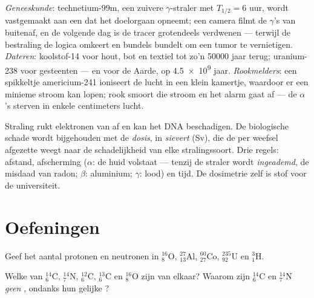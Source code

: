 \begin{example}\label{ex:g11:nucleus-radioactivity:uses}
\emph{Geneeskunde}: technetium-99m, een zuivere $\gamma$-straler met
$T_{1/2} = 6$ uur, wordt vastgemaakt aan een  dat het doelorgaan
opneemt; een camera filmt de $\gamma$'s van buitenaf, en de volgende dag is
de tracer grotendeels verdwenen --- terwijl de bestraling de logica
omkeert en bundels bundelt om een tumor te vernietigen. \emph{Dateren}:
koolstof-14 voor hout, bot en textiel tot zo'n \num{50000} jaar terug;
uranium-238 voor gesteenten --- en voor de Aarde, op \num{4.5e9} jaar.
\emph{Rookmelders}: een spikkeltje americium-241 ioniseert de lucht in een
klein kamertje, waardoor er een minieme stroom kan lopen; rook smoort die
stroom en het alarm gaat af --- de $\alpha$'s sterven in enkele centimeters
lucht.
\end{example}

\begin{remark}\label{rem:g11:nucleus-radioactivity:dose}
Straling rukt elektronen van  af en kan het DNA beschadigen. De
biologische schade wordt bijgehouden met de \emph{dosis}, in
\emph{sievert} (\unit{Sv}), die de per  weefsel
afgezette  weegt naar de schadelijkheid van elke stralingssoort.
Drie regels: afstand, afscherming ($\alpha$: de huid volstaat --- tenzij
de straler wordt \emph{ingeademd}, de misdaad van radon; $\beta$:
aluminium; $\gamma$: lood) en tijd. De dosimetrie zelf is stof voor de
universiteit.
\end{remark}

\section{Oefeningen}

\begin{exercise}[$\star$]\label{exo:g11:nucleus-radioactivity:1}
Geef het aantal protonen en neutronen in ${}^{16}_{8}\mathrm{O}$,
${}^{27}_{13}\mathrm{Al}$, ${}^{60}_{27}\mathrm{Co}$,
${}^{235}_{92}\mathrm{U}$ en ${}^{3}_{1}\mathrm{H}$.
\end{exercise}

\begin{exercise}[$\star$]\label{exo:g11:nucleus-radioactivity:2}
Welke van ${}^{14}_{6}\mathrm{C}$, ${}^{14}_{7}\mathrm{N}$,
${}^{12}_{6}\mathrm{C}$, ${}^{13}_{6}\mathrm{C}$ en
${}^{16}_{8}\mathrm{O}$ zijn  van elkaar? Waarom zijn
${}^{14}_{6}\mathrm{C}$ en ${}^{14}_{7}\mathrm{N}$ \emph{geen} ,
ondanks hun gelijke ?
\end{exercise}

